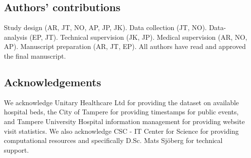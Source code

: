 \subsection*{Authors’ contributions}
Study design (AR, JT, NO, AP, JP, JK). Data collection (JT, NO). Data-analysis (EP, JT). Technical supervision (JK, JP). Medical supervision (AR, NO, AP). Manuscript preparation (AR, JT, EP). All authors have read and approved the final manuscript.

\subsection*{Acknowledgements}
We acknowledge Unitary Healthcare Ltd for providing the dataset on available hospital beds, the City of Tampere for providing timestamps for public events, and Tampere University Hospital information management for providing website visit statistics. We also acknowledge CSC - IT Center for Science for providing computational resources and specifically D.Sc. Mats Sjöberg for technical support.